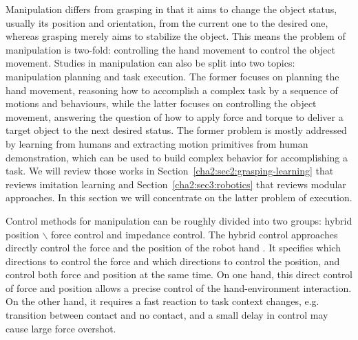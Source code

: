 Manipulation differs from grasping in that it aims to change the object status, usually its position and orientation, from the current one to the desired one, whereas grasping merely aims to stabilize the object.
This means the problem of manipulation is two-fold: controlling the hand movement to control the object movement.
Studies in manipulation can also be split into two topics: manipulation planning and task execution. The former focuses on planning the hand movement, reasoning how to accomplish a complex task by a sequence of motions and behaviours, while the latter focuses on controlling the object movement, answering the question of how to apply force and torque to deliver a target object to the next desired status. The former problem is mostly addressed by learning from humans and extracting motion primitives from human demonstration, which can be used to build complex behavior for accomplishing a task. We will review those works in Section~\ref{cha2:sec2:grasping-learning} that reviews imitation learning and Section~\ref{cha2:sec3:robotics} that reviews modular approaches. In this section we will concentrate on the latter problem of execution.



Control methods for manipulation can be roughly divided into two groups: hybrid position $\backslash$ force control and impedance control. The hybrid control approaches directly control the force and the position of the robot hand \citep{li1989grasping,yoshikawa1993coordinated}. It specifies which directions to control the force and which directions to control the position, and control both force and position at the same time. On one hand, this direct control of force and position allows a precise control of the hand-environment interaction. On the other hand, it requires a fast reaction to task context changes, e.g. transition between contact and no contact, and a small delay in control may cause large force overshot.


